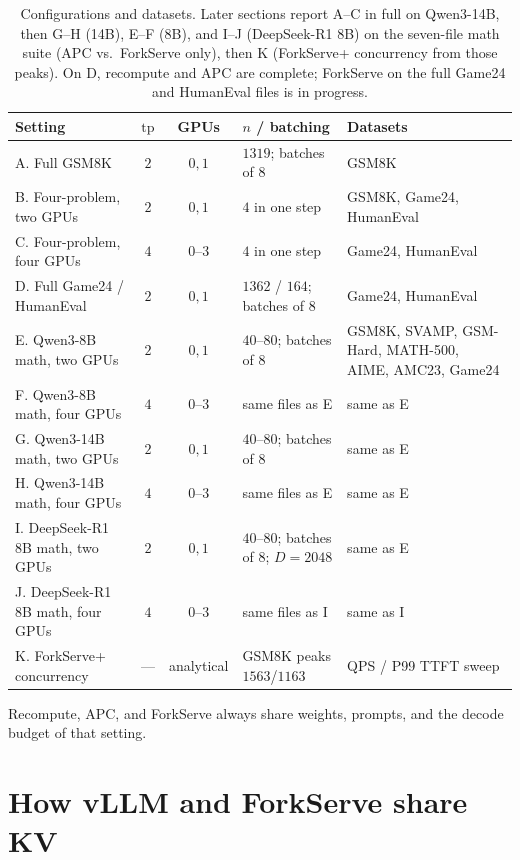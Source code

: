 \documentclass[11pt,a4paper]{article}
\begin{document}
\begin{table}[h]
\centering
\small
\begin{tabular}{@{}>{\raggedright\arraybackslash}p{}
c
c
>{\raggedright\arraybackslash}p{}
>{\raggedright\arraybackslash}p{}@{}}
\toprule
Setting & $\mathrm{tp}$ & GPUs & $n$ / batching & Datasets \\
\midrule
A. Full GSM8K & $2$ & $0,1$ & $1319$; batches of $8$ & GSM8K \\
B. Four-problem, two GPUs & $2$ & $0,1$ & $4$ in one step & GSM8K, Game24, HumanEval \\
C. Four-problem, four GPUs & $4$ & $0$--$3$ & $4$ in one step & Game24, HumanEval \\
D. Full Game24 / HumanEval & $2$ & $0,1$ & $1362$ / $164$; batches of $8$ & Game24, HumanEval \\
E. Qwen3-8B math, two GPUs & $2$ & $0,1$ & $40$--$80$; batches of $8$ & GSM8K, SVAMP, GSM-Hard, MATH-500, AIME, AMC23, Game24 \\
F. Qwen3-8B math, four GPUs & $4$ & $0$--$3$ & same files as E & same as E \\
G. Qwen3-14B math, two GPUs & $2$ & $0,1$ & $40$--$80$; batches of $8$ & same as E \\
H. Qwen3-14B math, four GPUs & $4$ & $0$--$3$ & same files as E & same as E \\
I. DeepSeek-R1 8B math, two GPUs & $2$ & $0,1$ & $40$--$80$; batches of $8$; $D{=}2048$ & same as E \\
J. DeepSeek-R1 8B math, four GPUs & $4$ & $0$--$3$ & same files as I & same as I \\
K. ForkServe+ concurrency & --- & analytical & GSM8K peaks $1563$/$1163$ & QPS / P99 TTFT sweep \\
\bottomrule
\end{tabular}
\caption{Configurations and datasets.
Later sections report A--C in full on Qwen3-14B, then G--H (14B), E--F (8B), and I--J (DeepSeek-R1 8B) on the seven-file math suite (APC vs.\ ForkServe only), then K (ForkServe+ concurrency from those peaks).
On D, recompute and APC are complete; ForkServe on the full Game24 and HumanEval files is in progress.}
\end{table}

Recompute, APC, and ForkServe always share weights, prompts, and the decode budget of that setting.

\section{How vLLM and ForkServe share KV}
\end{document}
